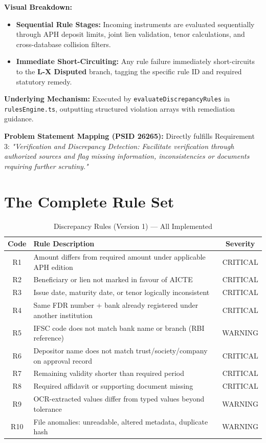 \documentclass[12pt, a4paper]{report}
\begin{document}
\begin{tcolorbox}[colback=keywordColor!5!white, colframe=keywordColor, title={Process Label: Multi-Stage Discrepancy Engine Pipeline}]
\textbf{Visual Breakdown:}
\begin{itemize}[leftmargin=1.5em]
  \item \textbf{Sequential Rule Stages:} Incoming instruments are evaluated sequentially through APH deposit limits, joint lien validation, tenor calculations, and cross-database collision filters.
  \item \textbf{Immediate Short-Circuiting:} Any rule failure immediately short-circuits to the \textbf{L-X Disputed} branch, tagging the specific rule ID and required statutory remedy.
\end{itemize}

\textbf{Underlying Mechanism:} Executed by \texttt{evaluateDiscrepancyRules} in \texttt{rulesEngine.ts}, outputting structured violation arrays with remediation guidance.

\textbf{Problem Statement Mapping (PSID 26265):} Directly fulfills Requirement 3: \textit{"Verification and Discrepancy Detection: Facilitate verification through authorized sources and flag missing information, inconsistencies or documents requiring further scrutiny."}
\end{tcolorbox}

\section{The Complete Rule Set}

\begin{table}[H]
\centering
\caption{Discrepancy Rules (Version 1) — All Implemented}
\label{tab:rules}
\begin{tabularx}{\textwidth}{|c|X|c|}
\hline
\textbf{Code} & \textbf{Rule Description} & \textbf{Severity} \\
\hline
R1 & Amount differs from required amount under applicable APH edition & CRITICAL \\
\hline
R2 & Beneficiary or lien not marked in favour of AICTE & CRITICAL \\
\hline
R3 & Issue date, maturity date, or tenor logically inconsistent & CRITICAL \\
\hline
R4 & Same FDR number + bank already registered under another institution & CRITICAL \\
\hline
R5 & IFSC code does not match bank name or branch (RBI reference) & WARNING \\
\hline
R6 & Depositor name does not match trust/society/company on approval record & CRITICAL \\
\hline
R7 & Remaining validity shorter than required period & CRITICAL \\
\hline
R8 & Required affidavit or supporting document missing & CRITICAL \\
\hline
R9 & OCR-extracted values differ from typed values beyond tolerance & WARNING \\
\hline
R10 & File anomalies: unreadable, altered metadata, duplicate hash & WARNING \\
\hline
\end{tabularx}
\end{table}
\end{document}
